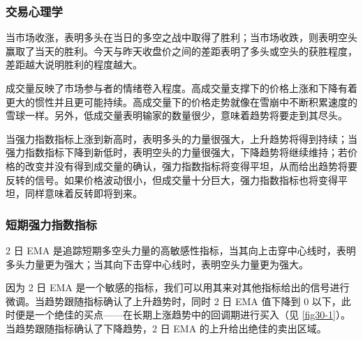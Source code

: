 \subsubsection*{交易心理学}
当市场收涨，表明多头在当日的多空之战中取得了胜利；当市场收跌，则表明空头赢取了当天的胜利。今天与昨天收盘价之间的差距表明了多头或空头的获胜程度，差距越大说明胜利的程度越大。

成交量反映了市场参与者的情绪卷入程度。高成交量支撑下的价格上涨和下降有着更大的惯性并且更可能持续。高成交量下的价格走势就像在雪崩中不断积累速度的雪球一样。另外，低成交量表明输家的数量很少，意味着趋势将要走到其尽头。

当强力指数指标上涨到新高时，表明多头的力量很强大，上升趋势将得到持续；当强力指数指标下降到新低时，表明空头的力量很强大，下降趋势将继续维持；若价格的改变并没有得到成交量的确认，强力指数指标将变得平坦，从而给出趋势将要反转的信号。如果价格波动很小，但成交量十分巨大，强力指数指标也将变得平坦，同样意味着反转即将到来。
\subsubsection*{短期强力指数指标}
2 日 EMA 是追踪短期多空头力量的高敏感性指标，当其向上击穿中心线时，表明多头力量更为强大；当其向下击穿中心线时，表明空头力量更为强大。

因为 2 日 EMA 是一个敏感的指标，我们可以用其来对其他指标给出的信号进行微调。当趋势跟随指标确认了上升趋势时，同时 2 日 EMA 值下降到 0 以下，此时便是一个绝佳的买点——在长期上涨趋势中的回调期进行买入（见 \autoref{fig30-1}）。当趋势跟随指标确认了下降趋势，2 日 EMA 的上升给出绝佳的卖出区域。


